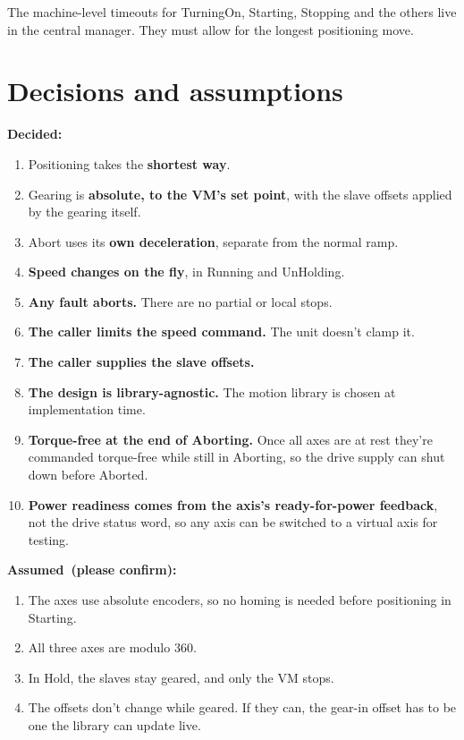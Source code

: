 \documentclass[11pt,a4paper]{report}
\newcommand{\decided}{\textcolor{decided}{\textbf{Decided}}}
\newcommand{\assumed}{\textcolor{assumed}{\textbf{Assumed}}}
\begin{document}
The machine-level timeouts for TurningOn, Starting, Stopping and the others live in the central
manager. They must allow for the longest positioning move.

\section{Decisions and assumptions}\label{sec:servo-decisions}

\textbf{\decided:}
\begin{enumerate}
  \item Positioning takes the \textbf{shortest way}.
  \item Gearing is \textbf{absolute, to the VM's set point}, with the slave offsets applied by the
        gearing itself.
  \item Abort uses its \textbf{own deceleration}, separate from the normal ramp.
  \item \textbf{Speed changes on the fly}, in Running and UnHolding.
  \item \textbf{Any fault aborts.} There are no partial or local stops.
  \item \textbf{The caller limits the speed command.} The unit doesn't clamp it.
  \item \textbf{The caller supplies the slave offsets.}
  \item \textbf{The design is library-agnostic.} The motion library is chosen at implementation
        time.
  \item \textbf{Torque-free at the end of Aborting.} Once all axes are at rest they're commanded
        torque-free while still in Aborting, so the drive supply can shut down before Aborted.
  \item \textbf{Power readiness comes from the axis's ready-for-power feedback}, not the drive
        status word, so any axis can be switched to a virtual axis for testing.
\end{enumerate}

\textbf{\assumed\ (please confirm):}
\begin{enumerate}
  \item The axes use absolute encoders, so no homing is needed before positioning in Starting.
  \item All three axes are modulo 360\textdegree.
  \item In Hold, the slaves stay geared, and only the VM stops.
  \item The offsets don't change while geared. If they can, the gear-in offset has to be one
        the library can update live.
\end{enumerate}
\end{document}
